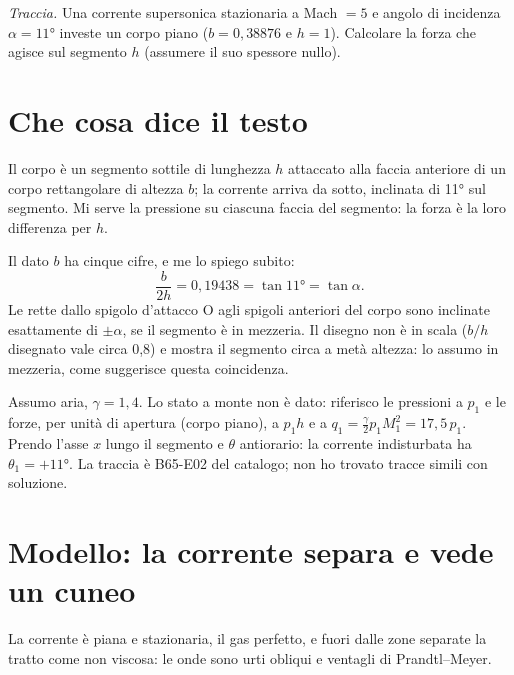 

\graphicspath{{../../svolgimenti/2021-09-14_B65-E02_forza_lastra/figure/}}



\maketitle

\emph{Traccia.} Una corrente supersonica stazionaria a Mach $=5$ e angolo di incidenza $\alpha=\ang{11}$ investe un
corpo piano ($b=0{,}38876$ e $h=1$). Calcolare la forza che agisce sul segmento $h$ (assumere il suo spessore nullo).


\section*{Che cosa dice il testo}
Il corpo è un segmento sottile di lunghezza $h$ attaccato alla faccia anteriore di un corpo rettangolare di altezza
$b$; la corrente arriva da sotto, inclinata di \ang{11} sul segmento. Mi serve la pressione su ciascuna faccia del
segmento: la forza è la loro differenza per $h$.

Il dato $b$ ha cinque cifre, e me lo spiego subito:
\[
\frac{b}{2h}=0{,}19438=\tan\ang{11}=\tan\alpha .
\]
Le rette dallo spigolo d'attacco O agli spigoli anteriori del corpo sono inclinate esattamente di $\pm\alpha$, se il
segmento è in mezzeria. Il disegno non è in scala ($b/h$ disegnato vale circa 0,8) e mostra il segmento circa a metà
altezza: lo assumo in mezzeria, come suggerisce questa coincidenza.

Assumo aria, $\gamma=1{,}4$. Lo stato a monte non è dato: riferisco le pressioni a $p_1$ e le forze, per unità di
apertura (corpo piano), a $p_1h$ e a $q_1=\tfrac{\gamma}{2}p_1M_1^2=17{,}5\,p_1$. Prendo l'asse $x$ lungo il segmento
e $\theta$ antiorario: la corrente indisturbata ha $\theta_1=+\ang{11}$. La traccia è B65-E02 del catalogo; non ho
trovato tracce simili con soluzione.

\section*{Modello: la corrente separa e vede un cuneo}
La corrente è piana e stazionaria, il gas perfetto, e fuori dalle zone separate la tratto come non viscosa: le onde
sono urti obliqui e ventagli di Prandtl--Meyer.

